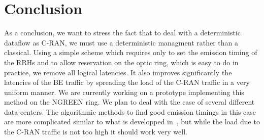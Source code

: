 \documentclass[10pt, conference, letterpaper]{IEEEtran}
\begin{document}
  \section*{Conclusion}
  
  As a conclusion, we want to stress the fact that to deal with a deterministic 
  dataflow as C-RAN, we must use a deterministic managment rather than a classical.
  Using a simple scheme which requires only to set the emission timing of the RRHs and to allow reservation 
  on the optic ring, which is easy to do in practice, we remove all logical latencies. It also improves 
  significantly the latencies of the BE traffic by spreading the load of the C-RAN traffic in a very uniform manner.  We are currently working on a prototype implementing this method on the NGREEN ring.
  We plan to deal with the case of several different data-centers. The algorithmic methods to find 
  good emission timings in this case are more complicated similar to what is developped in~\cite{dominique2018deterministic}, but while the load due to the C-RAN traffic is not too high it should work very well.  

\end{document}
